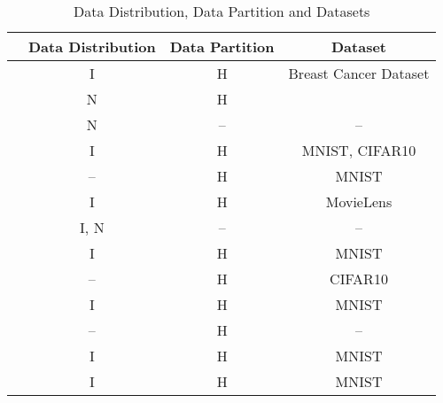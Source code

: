 \begin{table}[ht]
\centering
\caption{Data Distribution, Data Partition and Datasets}
\label{tab:data_distribution}
\begin{tabular}{c|c|c|c}
\hline \hline
                                    & Data Distribution & Data Partition & Dataset                            \\ \hline \hline
\cite{10.1145/3319535.3363256}      & I                 & H              & Breast Cancer Dataset              \\ \hline
\cite{8905038}                      & N                 & H              &                                    \\ \hline
\cite{9524833}                      & N                 & --             & --                                 \\ \hline
\cite{9127823}                      & I                 & H              & MNIST, CIFAR10                     \\ \hline
\cite{10.48550/arxiv.2101.03300}    & --                & H              & MNIST                              \\ \hline
\cite{9159643}                      & I                 & H              & MovieLens                          \\ \hline
\cite{10.1145/3422337.3447837}      & I, N              & --             & --                                 \\ \hline
\cite{9223754}                      & I                 & H              & MNIST                              \\ \hline
\cite{FANG20221}                    & --                & H              & CIFAR10                            \\ \hline
\cite{9399813}                      & I                 & H              & MNIST                              \\ \hline
\cite{9184854}                      & --                & H              & --                                 \\ \hline
\cite{8851649}                      & I                 & H              & MNIST                              \\ \hline
\cite{8994206}                      & I                 & H              & MNIST                              \\ \hline

\end{tabular}
\end{table}
